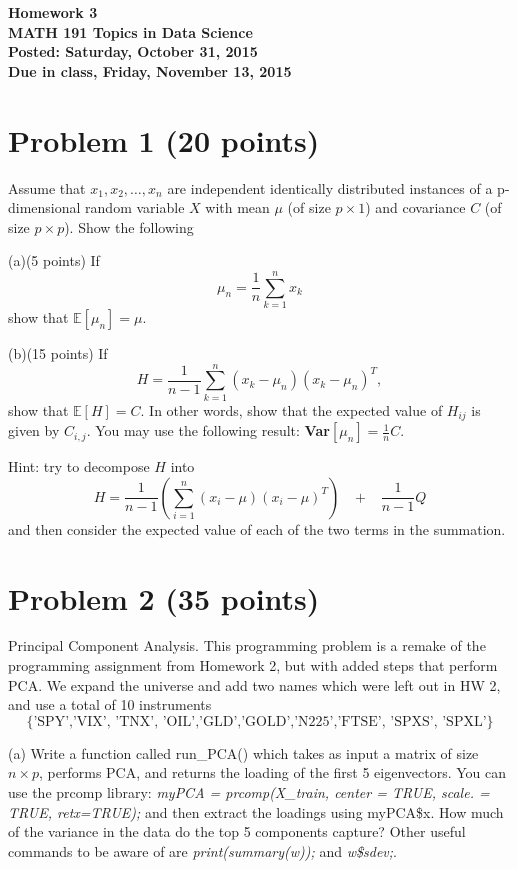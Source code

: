 \documentclass[12pt]{article}
\begin{document}
\begin{center}
{\bf Homework 3}\\
{\bf MATH 191 Topics in Data Science}\\
{\bf Posted: Saturday, October 31, 2015}\\
{\bf Due in class, Friday, November 13, 2015} \\
\end{center}


\section{Problem 1 (20 points) }

Assume that $x_1, x_2,\ldots, x_n$ are independent identically distributed instances of a p-dimensional random variable $X$ with mean $\mu$  (of size $p \times 1$) and covariance $C$ (of size $p \times p$). Show the following

(a)(5 points) If $$ \mu_n = \frac{1}{n} \sum_{k=1}^{n} x_k $$ show that $\mathbb{E}[\mu_n] = \mu $.

(b)(15 points) If 
$$ H = \frac{1}{n-1} \sum_{k=1}^n (x_k - \mu_n) (x_k - \mu_n)^T, $$
show that $\mathbb{E}[H] = C$. In other words, show that the expected value of $H_{ij}$ is given by $C_{i,j}$.
You may use the following result:  \textbf{Var}$[ \mu_n ] = \frac{1}{n} C $. 

Hint: try to decompose $H$ into 
$$ H = \frac{1}{n-1}  \left(  \sum_{i=1}^n (x_i - \mu)  (x_i - \mu)^T  \right)  \;\;\; + \;\; \; \frac{1}{n-1} Q $$
and then consider the expected value of each of the two terms in the summation. 



\section{Problem 2 (35 points)}

Principal Component Analysis.  This programming problem is a remake of the programming assignment from Homework 2, but with added steps that perform PCA. We expand the universe and add two names which were left out in HW 2, and use a total of 10 instruments
$$\{ \mbox{'SPY','\^{}VIX', '\^{}TNX', 'OIL','GLD','GOLD','\^{}N225','\^{}FTSE', 'SPXS', 'SPXL'} \}$$

(a) Write a function called run\_PCA() which takes as input a matrix of size $n \times p$, performs PCA, and returns the loading of the first 5 eigenvectors. You can use the prcomp library:  \textit{myPCA = prcomp(X\_train, center = TRUE, scale. = TRUE, retx=TRUE);} and then extract the loadings using myPCA\$x. How much of the variance in the data do the top 5 components capture?  Other useful commands to be aware of are \textit{print(summary(w));}  and  \textit{ w\$sdev;}.
\end{document}
